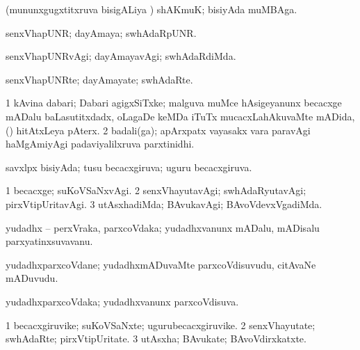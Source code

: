 {\bentry
{} 
\gl{\nA}
\expl{}
\bmng
(mununxgugxtitxruva bisigALiya \vi) shAKmuK; bisiyAda muMBAga. 
\emng
\eentry

\bentry
{} 
\gl{\gu}
\expl{}
\bmng
senxVhapUNR; dayAmaya; swhAdaRpUNR. 
\emng
\eentry

\bentry
{} 
\gl{\kirxvi}
\expl{}
\bmng
senxVhapUNRvAgi; dayAmayavAgi; swhAdaRdiMda. 
\emng
\eentry

\bentry
{} 
\gl{\nA}
\expl{}
\bmng
senxVhapUNRte; dayAmayate; swhAdaRte. 
\emng
\eentry

\bentry
{} 
\gl{\nA}
\expl{}
\bmng
\bnum
\num{1} kAvina dabari; Dabari agigxSiTxke; malguva muMce hAsigeyanunx becacxge mADalu baLasutitxdadx, oLagaDe keMDa iTuTx mucacxLahAkuvaMte mADida, (\sA) hitAtxLeya pAterx. 
\num{2} badali(ga); apArxpatx vayasakx \mo vara paravAgi haMgAmiyAgi padaviyalilxruva parxtinidhi. 
\enum
\emng
\eentry

\bentry
{} 
\gl{\gu}
\expl{}
\bmng
savxlpx bisiyAda; tusu becacxgiruva; uguru becacxgiruva. 
\emng
\eentry

\bentry
{} 
\gl{\kirxvi}
\expl{}
\bmng
\bnum
\num{1} becacxge; suKoVSaNxvAgi. 
\num{2} senxVhayutavAgi; swhAdaRyutavAgi; pirxVtipUritavAgi. 
\num{3} utAsxhadiMda; BAvukavAgi; BAvoVdevxVgadiMda. 
\enum
\emng
\eentry

\bentry
{} 
\gl{\nA}
\expl{}
\bmng
{} 
\emng
\eentry

\bentry
{} 
\gl{\nA}
\expl{}
\bmng
yudadhx -- perxVraka, parxcoVdaka; yudadhxvanunx mADalu, mADisalu parxyatinxsuvavanu. 
\emng
\eentry

\bentry
{} 
\gl{\nA}
\expl{}
\bmng
yudadhxparxcoVdane; yudadhxmADuvaMte parxcoVdisuvudu, citAvaNe mADuvudu. 
\emng
\eentry

\bentry
{} 
\gl{\gu}
\expl{}
\bmng
yudadhxparxcoVdaka; yudadhxvanunx parxcoVdisuva. 
\emng
\eentry

\bentry
{} 
\gl{\nA}
\expl{}
\bmng
\bnum
\num{1} becacxgiruvike; suKoVSaNxte; ugurubecacxgiruvike. 
\num{2} senxVhayutate; swhAdaRte; pirxVtipUritate. 
\num{3} utAsxha; BAvukate; BAvoVdirxkatxte. 
\enum
\emng
\eentry

}
